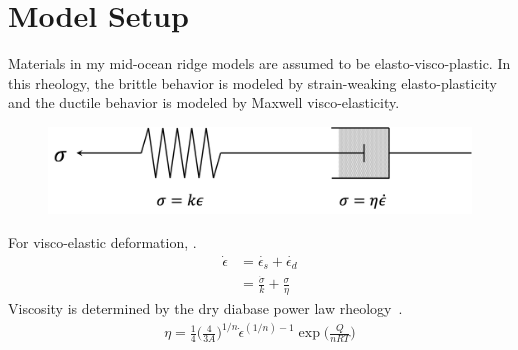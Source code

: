 \documentclass[letterpaper,12pt,notitle]{memphisthesis}                     %
\begin{document}
\section{Model Setup}
Materials in my mid-ocean ridge models are assumed to be elasto-visco-plastic. In this rheology, the brittle behavior is modeled by strain-weaking elasto-plasticity and the ductile behavior is modeled by Maxwell visco-elasticity. 
%
\begin{figure}[!htb]
	\centering
	\includegraphics[width=0.6\linewidth]{./figs/maxwell.png}
	\label{fig:maxwell}
\end{figure}
%
For visco-elastic deformation, .
\begin{align} \label{srate}
  \dot{\epsilon} &=  \dot{\epsilon_s} +  \dot{\epsilon_d} \\
                        &= \frac{ \dot{\sigma}}{k} + \frac{\sigma}{\eta}
\end{align}
Viscosity is determined by the dry diabase power law rheology~\citep{Kirby1987, Chen1990}.
\begin{align} \label{Visc}
 \eta = \frac{1}{4} \bigg( \frac{4}{3A} \bigg)^{1/n} \dot{\epsilon}^{(1/n)-1} \exp\bigg(\frac{Q}{nRT}\bigg)
\end{align}
\end{document}
